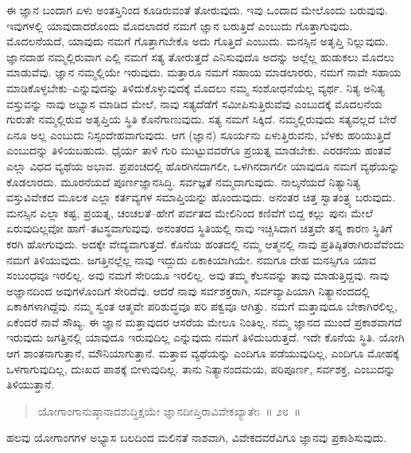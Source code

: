 ಈ ಜ್ಞಾನ ಬಂದಾಗ ಏಳು ಅಂತಸ್ತಿನಿಂದ ಕೂಡಿರುವಂತೆ ತೋರುವುದು. ಇವು ಒಂದಾದ ಮೇಲೊಂದು ಬರುವುವು. ಇವುಗಳಲ್ಲಿ ಯಾವುದಾದರೊಂದು ಮೊದಲಾದರೆ ನಮಗೆ ಜ್ಞಾನ ಬರುತ್ತಿದೆ ಎಂಬುದು ಗೊತ್ತಾಗುವುದು. ಮೊದಲನೆಯದೆ, ಯಾವುದು ನಮಗೆ ಗೊತ್ತಾಗಬೇಕೊ ಅದು ಗೊತ್ತಿದೆ ಎಂಬುದು. ಮನಸ್ಸಿನ ಅತೃಪ್ತಿ ನಿಲ್ಲುವುದು. ಜ್ಞಾನದಾಹ ನಮ್ಮಲ್ಲಿರುವಾಗ ಎಲ್ಲಿ ನಮಗೆ ಸತ್ಯ ತೋರುತ್ತದೆ ಎನಿಸುವುದೊ ಅದನ್ನು ಅಲ್ಲೆಲ್ಲ ಹುಡುಕಲು ಮೊದಲು ಮಾಡುವೆವು. ಜ್ಞಾನ ನಮ್ಮಲ್ಲಿಯೇ ಇರುವುದು. ಮತ್ತಾರೂ ನಮಗೆ ಸಹಾಯ ಮಾಡಲಾರರು, ನಮಗೆ ನಾವೇ ಸಹಾಯ ಮಾಡಿಕೊಳ್ಳಬೇಕು–ಎನ್ನುವುದನ್ನು ತಿಳಿದುಕೊಳ್ಳುವುದಕ್ಕೆ ಮೊದಲು ನಮ್ಮ ಸಂಶೋಧನೆಯೆಲ್ಲ ವ್ಯರ್ಥ. ನಿತ್ಯ ಅನಿತ್ಯ ವಸ್ತುವನ್ನು ನಾವು ಅಭ್ಯಾಸ ಮಾಡಿದ ಮೇಲೆ, ನಾವು ಸತ್ಯದೆಡೆಗೆ ಸಮೀಪಿಸುತ್ತಿರುವೆವು ಎಂಬುದಕ್ಕೆ ಮೊದಲನೆಯ ಗುರುತೇ ನಮ್ಮಲ್ಲಿರುವ ಅತೃಪ್ತಿಯ ಸ್ಥಿತಿ ಕೊನೆಗಾಣುವುದು. ಸತ್ಯ ನಮಗೆ ಸಿಕ್ಕಿದೆ. ನಮ್ಮಲ್ಲಿರುವುದು ಸತ್ಯವಲ್ಲದೆ ಬೇರೆ ಏನೂ ಅಲ್ಲ ಎಂಬುದು ನಿಸ್ಸಂದೇಹವಾಗುವುದು. ಆಗ (ಜ್ಞಾನ) ಸೂರ್ಯನು ಏಳುತ್ತಿರುವನು, ಬೆಳಕು ಹರಿಯುತ್ತಿದೆ ಎಂಬುದನ್ನು ತಿಳಿಯಬಹುದು. ಧೈರ್ಯ ತಾಳಿ ಗುರಿ ಮುಟ್ಟುವವರೆಗೂ ಪ್ರಯತ್ನ ಮಾಡಬೇಕು. ಎರಡನೆಯ ಹಂತವೆ ಎಲ್ಲಾ ವಿಧದ ವ್ಯಥೆಯ ಅಭಾವ. ಪ್ರಪಂಚದಲ್ಲಿ ಹೊರಗಿನದಾಗಲೀ, ಒಳಗಿನದಾಗಲೀ ಯಾವುದೂ ನಮಗೆ ವ್ಯಥೆಯನ್ನು ಕೊಡಲಾರದು. ಮೂರನೆಯದೆ ಪೂರ್ಣಜ್ಞಾನಸಿದ್ಧಿ. ಸರ್ವಜ್ಞತೆ ನಮ್ಮದಾಗುವುದು. ನಾಲ್ಕನೆಯದೆ ನಿತ್ಯಾನಿತ್ಯ ವಸ್ತುವಿವೇಕದ ಮೂಲಕ ಎಲ್ಲಾ ಕರ್ತವ್ಯಗಳ ಸಮಾಪ್ತಿಯನ್ನು ಹೊಂದುವುದು. ಅನಂತರ ಚಿತ್ತ ಸ್ವಾತಂತ್ರ್ಯ ಬರುವುದು. ಮನಸ್ಸಿನ ಎಲ್ಲಾ ಕಷ್ಟ, ಪ್ರಯತ್ನ, ಚಂಚಲತೆ–ಹೇಗೆ ಪರ್ವತದ ಮೇಲಿನಿಂದ ಕಣಿವೆಗೆ ಬಿದ್ದ ಕಲ್ಲು ಪುನಃ ಮೇಲೆ ಏರುವುದಿಲ್ಲವೋ ಹಾಗೆ–ತಟಸ್ಥವಾಗುವುವು. ಅನಂತರದ ಸ್ಥಿತಿಯಲ್ಲಿ ನಾವು ಇಚ್ಚಿಸಿದಾಗ ಚಿತ್ತವೇ ತನ್ನ ಕಾರಣ ಸ್ಥಿತಿಗೆ ಕರಗಿ ಹೋಗುವುದು. ಅದಕ್ಕೇ ವೇದ್ಯವಾಗುತ್ತದೆ. ಕೊನೆಯ ಹಂತದಲ್ಲಿ ನಮ್ಮ ಆತ್ಮನಲ್ಲಿ ನಾವು ಪ್ರತಿಷ್ಠಿತರಾಗಿರುವೆವೆಂದು ನಮಗೆ ತಿಳಿಯುವುದು. ಜಗತ್ತಿನಲ್ಲೆಲ್ಲ ನಾವು ಇದ್ದುದು ಏಕಾಕಿಯಾಗಿಯೇ. ನಮಗೂ ದೇಹ ಮನಸ್ಸಿಗೂ ಯಾವ ಸಂಬಂಧವೂ ಇರಲಿಲ್ಲ. ಅವು ನಮಗೆ ಸೇರಿಯೂ ಇರಲಿಲ್ಲ. ಅವು ತಮ್ಮ ಕೆಲಸವನ್ನು ತಾವು ಮಾಡುತ್ತಿದ್ದವು. ನಾವು ಅಜ್ಞಾನದಿಂದ ಅವುಗಳೊಂದಿಗೆ ಸೇರಿದೆವು. ಆದರೆ ನಾವು ಸರ್ವಶಕ್ತರಾಗಿ, ಸರ್ವವ್ಯಾಪಿಯಾಗಿ ನಿತ್ಯಾನಂದದಲ್ಲಿ ಏಕಾಕಿಗಳಾಗಿದ್ದೆವು. ನಮ್ಮ ಸ್ವಂತ ಆತ್ಮವೇ ಪರಿಶುದ್ಧವೂ ಪರಿ ಪಕ್ವವೂ ಆಗಿತ್ತು. ನಮಗೆ ಮತ್ತಾವುದೂ ಬೇಕಾಗಿರಲಿಲ್ಲ, ಏಕೆಂದರೆ ನಾವೆ ಸೌಖ್ಯ. ಈ ಜ್ಞಾನ ಮತ್ತಾವುದರ ಆಸರೆಯ ಮೇಲೂ ನಿಂತಿಲ್ಲ. ನಮ್ಮ ಜ್ಞಾನದ ಮುಂದೆ ಪ್ರಕಾಶವಾಗದೆ ಇರುವುದು ಜಗತ್ತಿನಲ್ಲಿ ಯಾವುದೂ ಇರುವುದಿಲ್ಲ ಎನ್ನುವುದು ನಮಗೆ ತಿಳಿದುಬರುತ್ತದೆ. ಇದೇ ಕೊನೆಯ ಸ್ಥಿತಿ. ಯೋಗಿ ಆಗ ಶಾಂತನಾಗುತ್ತಾನೆ, ಮೌನಿಯಾಗುತ್ತಾನೆ. ಮತ್ತಾವ ವ್ಯಥೆಯನ್ನು ಎಂದಿಗೂ ಪಡೆಯುವುದಿಲ್ಲ, ಎಂದಿಗೂ ಮೋಹಕ್ಕೆ ಒಳಗಾಗುವುದಿಲ್ಲ, ದುಃಖದ ಪಾಶಕ್ಕೆ ಬೀಳುವುದಿಲ್ಲ. ತಾನು ನಿತ್ಯಾನಂದಮಯ, ಪರಿಪೂರ್ಣ, ಸರ್ವಶಕ್ತ, ಎಂಬುದನ್ನು ತಿಳಿಯುತ್ತಾನೆ. 

\vspace{-0.3cm}

\begin{verse}
ಯೋಗಾಂಗಾನುಷ್ಠಾನಾದಶುದ್ಧಿಕ್ಷಯೇ ಜ್ಞಾನದೀಪ್ತಿರಾವಿವೇಕಖ್ಯಾತೇಃ~॥ ೨೮~॥
\end{verse}

\vspace{-0.3cm}

ಹಲವು ಯೋಗಾಂಗಗಳ ಅಭ್ಯಾಸ ಬಲದಿಂದ ಮಲಿನತೆ ನಾಶವಾಗಿ, ವಿವೇಕದವರೆವಿಗೂ ಜ್ಞಾನವು ಪ್ರಕಾಶಿಸುವುದು. 


